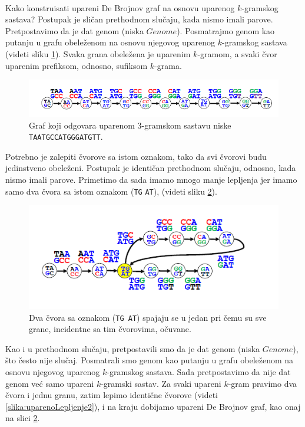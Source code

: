 ~\\

Kako konstruisati upareni De Brojnov graf na osnovu uparenog $k$-gramskog sastava? Postupak je sličan prethodnom slučaju, kada nismo imali parove. Pretpostavimo da je dat genom (niska $Genome$). Posmatrajmo genom kao putanju u grafu obeleženom na osnovu njegovog uparenog $k$-gramskog sastava (videti sliku \ref{slika:upareniDeBrojnov}). Svaka grana obeležena je uparenim $k$-gramom, a svaki čvor uparenim prefiksom, odnosno, sufiksom $k$-grama.

\begin{figure}[h]
	\centering
	\includegraphics[width=1\textwidth]{poglavlja/3/slike/upareni_debrojnov.png}
	\caption{Graf koji odgovara uparenom 3-gramskom sastavu niske \texttt{TAATGCCATGGGATGTT}.}
	\label{slika:upareniDeBrojnov}
\end{figure} 

Potrebno je zalepiti čvorove sa istom oznakom, tako da svi čvorovi budu jedinstveno obeleženi. Postupak je identičan prethodnom slučaju, odnosno, kada nismo imali parove. Primetimo da sada imamo mnogo manje lepljenja jer imamo samo dva čvora sa istom oznakom (\texttt{TG} \texttt{AT}), (videti sliku \ref{slika:uparenoLepljenje}).

\begin{figure}[h]
	\centering
	\includegraphics[width=1\textwidth]{poglavlja/3/slike/upareno_lepljenje.png}
	\caption{Dva čvora sa oznakom (\texttt{TG AT}) spajaju se u jedan pri čemu su sve grane, incidentne sa tim čvorovima, očuvane.}
	\label{slika:uparenoLepljenje}
\end{figure} 

Kao i u prethodnom slučaju, pretpostavili smo da je dat genom (niska $Genome$), što često nije slučaj. Posmatrali smo genom kao putanju u grafu obeleženom na osnovu njegovog uparenog $k$-gramskog sastava. Sada pretpostavimo da nije dat genom već samo upareni $k$-gramski sastav. Za svaki upareni $k$-gram pravimo dva čvora i jednu granu, zatim lepimo identične čvorove (videti \ref{slika:uparenoLepljenje2}), i na kraju dobijamo upareni De Brojnov graf, kao onaj na slici \ref{slika:uparenoLepljenje}.

